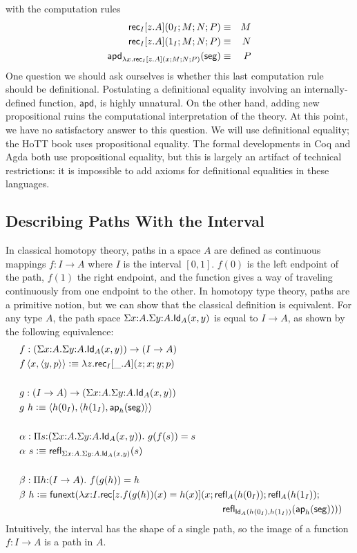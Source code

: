 \documentclass[11pt]{article}
\newcommand*{\Interval}{I}
\newcommand*{\Izero}{0_I}
\newcommand*{\Ione}{1_I}
\newcommand*{\Iseg}{\mathsf{seg}}
\newcommand*{\ap}{\mathsf{ap}}
\newcommand*{\apd}{\mathsf{apd}}
\newcommand*{\funext}{\mathsf{funext}}
\begin{document}
with the computation rules
\begin{eqnarray*}
  \rec_\Interval[z.A](\Izero;M;N;P) &\jdeq& M \\
  \rec_\Interval[z.A](\Ione;M;N;P) &\jdeq& N \\
  \apd_{\lambda x.\rec_\Interval[z.A](x;M;N;P)}(\Iseg) &\jdeq& P
\end{eqnarray*}
One question we should ask ourselves is whether this last computation rule should be definitional. Postulating a definitional equality involving an internally-defined function, $\apd$, is highly unnatural. On the other hand, adding new propositional ruins the computational interpretation of the theory. At this point, we have no satisfactory answer to this question. We will use definitional equality; the HoTT book uses propositional equality. The formal developments in Coq and Agda both use propositional equality, but this is largely an artifact of technical restrictions: it is impossible to add axioms for definitional equalities in these languages.

\subsection*{Describing Paths With the Interval}

In classical homotopy theory, paths in a space $A$ are defined as continuous mappings $f : I \to A$ where $I$ is the interval $[0,1]$. $f(0)$ is the left endpoint of the path, $f(1)$ the right endpoint, and the function gives a way of traveling continuously from one endpoint to the other. In homotopy type theory, paths are a primitive notion, but we can show that the classical definition is equivalent. For any type $A$, the path space $\Sigma x{:}A. \Sigma y{:}A. \mathsf{Id}_{A}(x,y)$ is equal to $I \to A$, as shown by the following equivalence:
\begin{align*}
  & f : (\Sigma x{:}A. \Sigma y{:}A. \Id{A}(x,y)) \to (I \to A) \\
  & f \left<x,\left<y,p\right>\right> \defeq \lambda z. \rec_\Interval[\_.A](z;x;y;p) \\
  ~ \\
  & g : (I \to A) \to (\Sigma x{:}A.\Sigma y{:}A. \Id{A}(x,y)) \\
  & g~h \defeq \left< h(\Izero), \left<h(\Ione), \ap_h(\Iseg)\right> \right> \\
  ~ \\
  & \alpha : \Pi s{:} (\Sigma x{:}A.\Sigma y{:}A. \Id{A}(x,y)).~g(f(s)) = s \\
  & \alpha~s \defeq \refl{\Sigma x{:}A. \Sigma y{:}A. \Id{A}(x,y)}(s) \\ 
  ~ \\
  & \beta : \Pi h{:}(I \to A).~f(g(h)) = h \\
  & \beta~h \defeq \funext(\lambda x{:}I. \rec[z. f(g(h))(x) = h(x)](x; \refl{A}(h(\Izero)); \refl{A}(h(\Ione)); \\
  & \hspace{210pt} \refl{\Id{A}(h(\Izero),h(\Ione))}(\ap_h(\Iseg))))
\end{align*}
Intuitively, the interval has the shape of a single path, so the image of a function $f : I \to A$ is a path in $A$.
\end{document}
